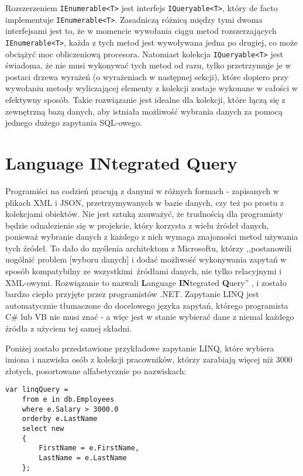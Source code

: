 Rozszerzeniem \texttt{IEnumerable<T>} jest interfejs \texttt{IQueryable<T>}, który de facto implementuje \texttt{IEnumerable<T>}. Zasadniczą różnicą między tymi dwoma interfejsami jest to, że w momencie wywołania ciągu metod rozszerzających \texttt{IEnumerable<T>}, każda z tych metod jest wywoływana jedna po drugiej, co może obciążyć moc obliczeniową procesora. Natomiast kolekcja \texttt{IQueryable<T>} jest świadoma, że nie musi wykonywać tych metod od razu, tylko przetrzymuje je w postaci drzewa wyrażeń (o wyrażeniach w następnej sekcji), które dopiero przy wywołaniu metody wyliczającej elementy z kolekcji zostaje wykonane w całości w efektywny sposób. Takie rozwiązanie jest idealne dla kolekcji, które łączą się z zewnętrzną bazą danych, aby istniała możliwość wybrania danych za pomocą jednego dużego zapytania SQL-owego.

\section{Language INtegrated Query}
Programiści na codzień pracują z danymi w różnych formach - zapisanych w plikach XML i JSON, przetrzymywanych w bazie danych, czy też po prostu z kolekcjami obiektów. Nie jest sztuką zauważyć, że trudnością dla programisty będzie odnalezienie się w projekcie, który korzysta z wielu źródeł danych, ponieważ wybranie danych z każdego z nich wymaga znajomości metod używania tych źródeł. To dało do myślenia architektom z Microsoftu, którzy ,,postanowili uogólnić problem [wyboru danych] i dodać możliwość wykonywania zapytań w sposób kompatybilny ze wszystkimi źródłami danych, nie tylko relacyjnymi i XML-owymi. Rozwiązanie to nazwali \textbf{L}anguage \textbf{IN}tegrated \textbf{Q}uery'' \cite{msdn_linq}, i zostało bardzo ciepło przyjęte przez programistów .NET. Zapytanie LINQ jest automatycznie tłumaczone do docelowego języka zapytań, którego programista C\# lub VB nie musi znać - a więc jest w stanie wybierać dane z niemal każdego źródła z użyciem tej samej składni.

Poniżej zostało przedstawione przykładowe zapytanie LINQ, które wybiera \linebreak imiona i nazwiska osób z kolekcji pracowników, którzy zarabiają więcej niż 3000 złotych, posortowane alfabetycznie po nazwiskach:

\begin{lstlisting}
var linqQuery = 
    from e in db.Employees
    where e.Salary > 3000.0
    orderby e.LastName
    select new
    { 
        FirstName = e.FirstName,
        LastName = e.LastName
    };
\end{lstlisting}

